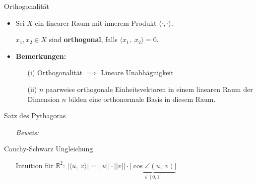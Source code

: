 \documentclass[14pt, aspectratio=169, handout]{beamer}
\begin{document}
\begin{frame}{Orthogonalität}
    \begin{itemize}
        \item Sei $X$ ein linearer Raum mit innerem Produkt $\langle \cdot, \cdot \rangle$.
        \item[] $x_1, x_2 \in X$ sind \textbf{orthogonal}, falls $\langle x_1, \; x_2\rangle = 0$.
        \item[] 
        \item \textbf{Bemerkungen:}\begin{itemize}
            \item[(i)] Orthogonalität $\implies$ Lineare Unabhägnigkeit
            \item[] 
            \item[(ii)] $n$ paarweise orthogonale Einheitsvektoren in einem linearen Raum der Dimension $n$ bilden eine orthonormale Basis in diesem Raum.
        \end{itemize}
    \end{itemize}
\end{frame}

\begin{frame}{Satz des Pythagoras}
    \begin{itemize}
        \item[] 
        \item[] 
        \item[] \textit{Beweis:} 
        \item[]
        \item[] 
    \end{itemize}
\end{frame}

\begin{frame}{Cauchy-Schwarz Ungleichung}
    \begin{itemize}
        \item[] 
        \item[] 
        \item[] Intuition für $\mathbb{R}^2$: \hspace{10pt} $\left| \langle u, \; v \rangle \right| = ||u|| \cdot ||v|| \cdot \underbrace{\left| \cos \angle(u, \; v) \right|}_{\in [0,1]}$
    \end{itemize}
\end{frame}
\end{document}
